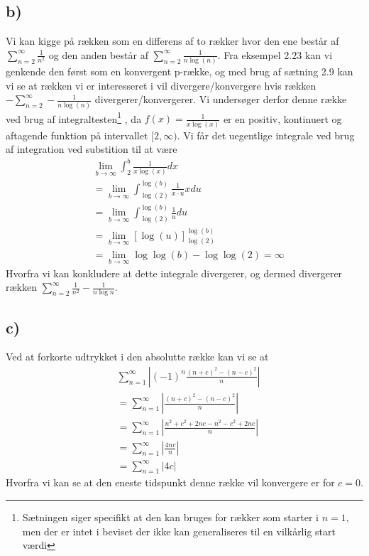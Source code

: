 \documentclass{article}
\newcommand{\abs}[1]{\left| #1\right|}
\newcommand{\lrb}[1]{\left[ #1\right]}
\begin{document}
\subsection*{b)}
Vi kan kigge på rækken som en differens af to rækker 
hvor den ene består af $\sum_{n=2}^{\infty} \frac{1}{n^2}$ 
og den anden består af $\sum_{n=2}^{\infty} \frac{1}{n\log(n)}$. 
Fra eksempel 2.23\cite{an1} kan vi genkende den først som en konvergent p-række, 
og med brug af sætning 2.9\cite{an1} kan vi se at rækken vi er interesseret i vil
divergere/konvergere hvis rækken $-\sum_{n=2}^{\infty} - \frac{1}{n\log(n)}$ divergerer/konvergerer.
Vi undersøger derfor denne række ved brug af integraltesten\footnote{
    Sætningen siger specifikt at den kan bruges for rækker som starter i $n=1$,
    men der er intet i beviset der ikke kan generaliseres til en vilkårlig start værdi} 
\cite[sætning 2.20]{an1}, da
$f(x)=\frac{1}{x\log(x)}$ er en positiv, kontinuert og aftagende funktion på intervallet $[2, \infty)$.
Vi får det uegentlige integrale ved brug af integration ved substition \cite[sætning 5.39]{an0} til at være
\begin{align*}
   &\lim_{b \to \infty} \int_{2}^{b} \frac{1}{x\log(x)} dx \\
   &=\lim_{b \to \infty} \int_{\log(2)}^{\log(b)} \frac{1}{x\cdot u}x du \\
   &=\lim_{b \to \infty} \int_{\log(2)}^{\log(b)} \frac{1}{u} du \\
   &=\lim_{b \to \infty} \lrb{\log(u)}_{\log(2)}^{\log(b)} \\
   &=\lim_{b \to \infty} \log\log(b) - \log\log(2)
   =\infty
\end{align*}
Hvorfra vi kan konkludere at dette integrale divergerer, og dermed divergerer rækken 
$\sum_{n=2}^{\infty}\frac{1}{n^2} - \frac{1}{n\log{n}}$.

\subsection*{c)}
Ved at forkorte udtrykket i den absolutte række kan vi se at
\begin{align*}
    &\sum_{n=1}^{\infty} \abs{(-1)^n \frac{(n+c)^2 - (n-c)^2}{n}} \\
    &=\sum_{n=1}^{\infty} \abs{\frac{(n+c)^2 - (n-c)^2}{n}} \\
    &=\sum_{n=1}^{\infty} \abs{\frac{n^2+c^2 + 2nc - n^2 - c^2 + 2nc}{n}} \\
    &=\sum_{n=1}^{\infty} \abs{\frac{4nc}{n}} \\
    &=\sum_{n=1}^{\infty} \abs{4c}
\end{align*}
Hvorfra vi kan se at den eneste tidspunkt denne række vil konvergere er for $c=0$.
\end{document}
